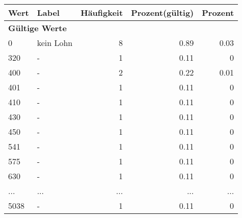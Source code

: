      \begin{longtable}{lXrrr}
     \toprule
     \textbf{Wert} & \textbf{Label} & \textbf{Häufigkeit} & \textbf{Prozent(gültig)} & \textbf{Prozent} \\
     \endhead
     \midrule
     \multicolumn{5}{l}{\textbf{Gültige Werte}}\\
        0 & \multicolumn{1}{X}{kein Lohn} & %
          \num{8} &
          \num[round-mode=places,round-precision=2]{0,89} &
          \num[round-mode=places,round-precision=2]{0,03} \\
        320 & \multicolumn{1}{X}{-} & %
          \num{1} &
          \num[round-mode=places,round-precision=2]{0,11} &
          \num[round-mode=places,round-precision=2]{0} \\
        400 & \multicolumn{1}{X}{-} & %
          \num{2} &
          \num[round-mode=places,round-precision=2]{0,22} &
          \num[round-mode=places,round-precision=2]{0,01} \\
        401 & \multicolumn{1}{X}{-} & %
          \num{1} &
          \num[round-mode=places,round-precision=2]{0,11} &
          \num[round-mode=places,round-precision=2]{0} \\
        410 & \multicolumn{1}{X}{-} & %
          \num{1} &
          \num[round-mode=places,round-precision=2]{0,11} &
          \num[round-mode=places,round-precision=2]{0} \\
        430 & \multicolumn{1}{X}{-} & %
          \num{1} &
          \num[round-mode=places,round-precision=2]{0,11} &
          \num[round-mode=places,round-precision=2]{0} \\
        450 & \multicolumn{1}{X}{-} & %
          \num{1} &
          \num[round-mode=places,round-precision=2]{0,11} &
          \num[round-mode=places,round-precision=2]{0} \\
        541 & \multicolumn{1}{X}{-} & %
          \num{1} &
          \num[round-mode=places,round-precision=2]{0,11} &
          \num[round-mode=places,round-precision=2]{0} \\
        575 & \multicolumn{1}{X}{-} & %
          \num{1} &
          \num[round-mode=places,round-precision=2]{0,11} &
          \num[round-mode=places,round-precision=2]{0} \\
        630 & \multicolumn{1}{X}{-} & %
          \num{1} &
          \num[round-mode=places,round-precision=2]{0,11} &
          \num[round-mode=places,round-precision=2]{0} \\
       ... & ... & ... & ... & ... \\
        5038 & \multicolumn{1}{X}{-} & %
          \num{1} &
          \num[round-mode=places,round-precision=2]{0,11} &
          \num[round-mode=places,round-precision=2]{0} \\


\end{longtable}
